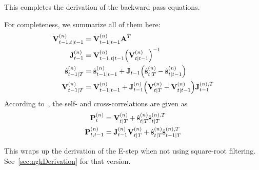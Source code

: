 			This completes the derivation of the backward pass equations.

			For completeness, we summarize all of them here:
			\begin{align}
				\boldsymbol{\mathrm{V}}_{t - 1, t \vert t - 1}^{(n)} &= \boldsymbol{\mathrm{V}}_{t - 1 \vert t - 1}^{(n)} \boldsymbol{\mathrm{A}}^T  \nonumber \\
				\boldsymbol{\mathrm{J}}_{t - 1}^{(n)} &= \boldsymbol{\mathrm{V}}_{t - 1, t \vert t - 1}^{(n)} \Big(\boldsymbol{\mathrm{V}}_{t \vert t - 1}^{(n)}\Big)^{-1}  \nonumber \\
				\hat{\boldsymbol{\mathrm{s}}}_{t - 1 \vert T}^{(n)} &= \hat{\boldsymbol{\mathrm{s}}}_{t - 1 \vert t - 1}^{(n)} + \boldsymbol{\mathrm{J}}_{t - 1} \Big(\hat{\boldsymbol{\mathrm{s}}}_{t \vert T}^{(n)} - \hat{\boldsymbol{\mathrm{s}}}_{t \vert t - 1}^{(n)}\Big)  \label{eq:posteriorMean} \\
				\boldsymbol{\mathrm{V}}_{t - 1 \vert T}^{(n)} &= \boldsymbol{\mathrm{V}}_{t - 1 \vert t - 1}^{(n)} + \boldsymbol{\mathrm{J}}_{t - 1}^{(n)} \Big(\boldsymbol{\mathrm{V}}_{t \vert T}^{(n)} - \boldsymbol{\mathrm{V}}_{t \vert t - 1}^{(n)}\Big) \boldsymbol{\mathrm{J}}_{t - 1}^{(n), T}  \label{eq:posteriorCov}
			\end{align}
			According to~\cite{minkaHiddenMarkovModels1999}, the self- and cross-correlations are given as
			\begin{align*}
				\boldsymbol{\mathrm{P}}_t^{(n)} &= \boldsymbol{\mathrm{V}}_{t \vert T}^{(n)} + \hat{\boldsymbol{\mathrm{s}}}_{t \vert T}^{(n)} \hat{\boldsymbol{\mathrm{s}}}_{t \vert T}^{(n), T} \\
				\boldsymbol{\mathrm{P}}_{t, t - 1}^{(n)} &= \boldsymbol{\mathrm{J}}_{t - 1}^{(n)} \boldsymbol{\mathrm{V}}_{t \vert T}^{(n)} + \hat{\boldsymbol{\mathrm{s}}}_{t \vert T}^{(n)} \hat{\boldsymbol{\mathrm{s}}}_{t - 1 \vert T}^{(n), T}
			\end{align*}

			This wraps up the derivation of the E-step when not using square-root filtering. See~\autoref{sec:ngkDerivation} for that version.


